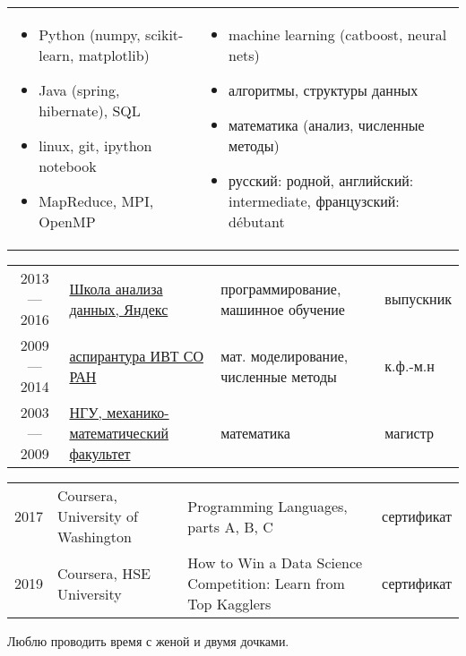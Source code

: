 \documentclass[11pt]{article}
\begin{document}
\begin{longtable} {p{}p{}}
\vspace{-2.2em}
\begin{itemize}
	\item Python (numpy, scikit-learn, matplotlib)
	\item Java (spring, hibernate), SQL
	\item linux, git, ipython notebook
	\item MapReduce, MPI, OpenMP
\end{itemize}
&
\vspace{-2.2em}
\begin{itemize}
	\item machine learning (catboost, neural nets)
	\item алгоритмы, структуры данных
	\item математика (анализ, численные методы)
	\item русский: родной, английский: intermediate, французский: débutant
\end{itemize}
\\
\end{longtable}

\vspace{-0.5em}

\begin{longtable} {cp{}p{}l}
2013 — 2016	& \href{https://yandexdataschool.ru}{Школа анализа данных, Яндекс} & программирование, машинное обучение & выпускник \vspace{0.5em}\\
2009 — 2014	& \href{http://www.ict.nsc.ru/ru/education/postgraduate}{аспирантура ИВТ СО РАН} & мат. моделирование, численные методы & к.ф.-м.н \vspace{0.5em}\\
2003 — 2009	& \href{https://www.nsu.ru/n/mathematics-mechanics-department/}{НГУ, механико-математический факультет} & математика & магистр \vspace{0.5em}\\
\end{longtable}

\begin{longtable} {cp{}p{}l}
2017 & Coursera, University of Washington & Programming Languages, parts A, B, C & 	сертификат \vspace{0.5em}\\
2019 & Coursera, HSE University & How to Win a Data Science Competition: Learn from Top Kagglers & сертификат \vspace{0.5em}\\
\end{longtable}


\vspace{0.5em} Люблю проводить время с женой и двумя дочками.
\end{document}
